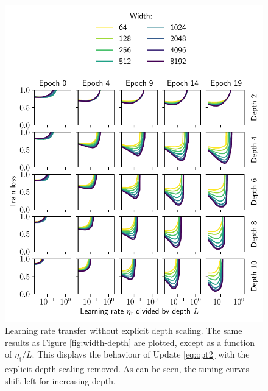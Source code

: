 \begin{refsection}
\begin{figure}[p]
    \includegraphics{figures/landscape-lesion.pdf}
    \caption[Learning rate transfer without explicit depth scaling]{Learning rate transfer without explicit depth scaling. The same results as Figure \ref{fig:width-depth} are plotted, except as a function of $\eta_\dagger/L$. This displays the behaviour of Update \ref{eq:opt2} with the explicit depth scaling removed. As can be seen, the tuning curves shift left for increasing depth.}
    \label{fig:width-depth-lesion}
\end{figure}

\clearpage
\printbibliography[heading=subbibliography]
\end{refsection}